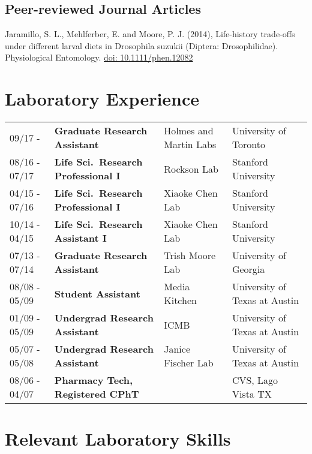 \documentclass[letterpaper]{article}
\renewenvironment{itemize}{
  \begin{list}{}{
    \setlength{\leftmargin}{1.5em}
  }
}{
  \end{list}
}
\begin{document}
\subsection*{Peer-reviewed Journal Articles}

\begin{itemize}
\item Jaramillo, S. L., Mehlferber, E. and Moore, P. J. (2014), 
Life-history trade-offs under different larval diets in Drosophila suzukii 
(Diptera: Drosophilidae). Physiological Entomology. 
\href{http://onlinelibrary.wiley.com/doi/10.1111/phen.12082/full}{doi: 10.1111/phen.12082}
\end{itemize}


\section*{Laboratory Experience}
\begin{tabular}{llll}
09/17 - 	     & {\bf Graduate Research Assistant} & Holmes and Martin Labs & University of Toronto \\
08/16 - 07/17 & {\bf Life Sci.\ Research Professional I} & Rockson Lab		& Stanford University \\
04/15 - 07/16 & {\bf Life Sci.\ Research Professional I} & Xiaoke Chen Lab	& Stanford University \\
10/14 - 04/15 & {\bf Life Sci.\ Research Assistant I}	& Xiaoke Chen Lab	& Stanford University \\
07/13 - 07/14 & {\bf Graduate Research Assistant}	& Trish Moore Lab	& University of Georgia \\
08/08 - 05/09 & {\bf Student Assistant}			& Media Kitchen		& University of Texas at Austin \\
01/09 - 05/09 & {\bf Undergrad Research Assistant}	& ICMB			& University of Texas at Austin \\
05/07 - 05/08 & {\bf Undergrad Research Assistant}	& Janice Fischer Lab	& University of Texas at Austin \\
08/06 - 04/07 & {\bf Pharmacy Tech, Registered CPhT}	& 			& CVS, Lago Vista TX \\
\end{tabular}


\section*{Relevant Laboratory Skills}
\end{document}
